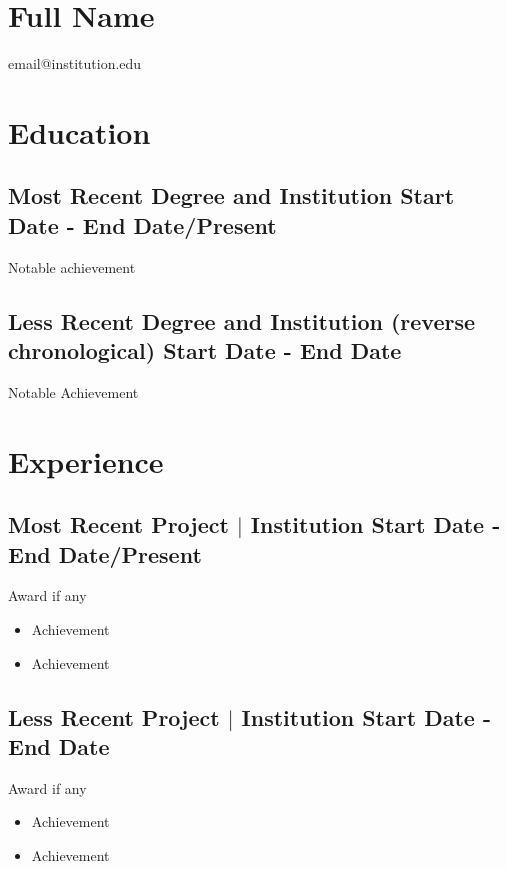 \documentclass[12pt]{article}
\begin{document}
\thispagestyle{plain}
 \section*{Full Name}
 email@institution.edu
 \section*{Education}
\subsection*{Most Recent Degree and Institution \hfill Start Date - End Date/Present}
\begin{description}
    \item Notable achievement
\end{description}
\vspace*{-10pt}
\subsection*{Less Recent Degree and Institution (reverse chronological) \hspace*{\fill}Start Date - End Date}
\begin{description}
    \item Notable Achievement
\end{description}


\section*{Experience}
\subsection*{Most Recent Project $\lvert$ Institution \hfill Start Date - End Date/Present}
\begin{description}
    \item Award if any 
\end{description}
    \begin{itemize}
        \item Achievement
        \item Achievement
    \end{itemize}

\subsection*{Less Recent Project $\lvert$ Institution \hfill Start Date - End Date}
\begin{description}
    \item Award if any 
\end{description}
    \begin{itemize}
        \item Achievement
        \item Achievement
    \end{itemize}
\end{document}
